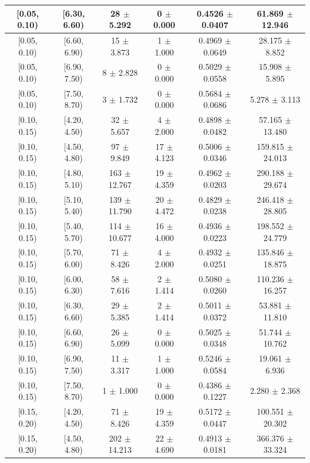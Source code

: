 \begin{longtable}{|c|c|c|c|c|c|}
\hline
[0.05, 0.10) & [6.30, 6.60) & 28 $\pm$ 5.292 & 0 $\pm$ 0.000 & 0.4526 $\pm$ 0.0407 & 61.869 $\pm$ 12.946 \\ 
\hline
[0.05, 0.10) & [6.60, 6.90) & 15 $\pm$ 3.873 & 1 $\pm$ 1.000 & 0.4969 $\pm$ 0.0649 & 28.175 $\pm$ 8.852 \\ 
\hline
[0.05, 0.10) & [6.90, 7.50) & 8 $\pm$ 2.828 & 0 $\pm$ 0.000 & 0.5029 $\pm$ 0.0558 & 15.908 $\pm$ 5.895 \\ 
\hline
[0.05, 0.10) & [7.50, 8.70) & 3 $\pm$ 1.732 & 0 $\pm$ 0.000 & 0.5684 $\pm$ 0.0686 & 5.278 $\pm$ 3.113 \\ 
\hline
[0.10, 0.15) & [4.20, 4.50) & 32 $\pm$ 5.657 & 4 $\pm$ 2.000 & 0.4898 $\pm$ 0.0482 & 57.165 $\pm$ 13.480 \\ 
\hline
[0.10, 0.15) & [4.50, 4.80) & 97 $\pm$ 9.849 & 17 $\pm$ 4.123 & 0.5006 $\pm$ 0.0346 & 159.815 $\pm$ 24.013 \\ 
\hline
[0.10, 0.15) & [4.80, 5.10) & 163 $\pm$ 12.767 & 19 $\pm$ 4.359 & 0.4962 $\pm$ 0.0203 & 290.188 $\pm$ 29.674 \\ 
\hline
[0.10, 0.15) & [5.10, 5.40) & 139 $\pm$ 11.790 & 20 $\pm$ 4.472 & 0.4829 $\pm$ 0.0238 & 246.418 $\pm$ 28.805 \\ 
\hline
[0.10, 0.15) & [5.40, 5.70) & 114 $\pm$ 10.677 & 16 $\pm$ 4.000 & 0.4936 $\pm$ 0.0223 & 198.552 $\pm$ 24.779 \\ 
\hline
[0.10, 0.15) & [5.70, 6.00) & 71 $\pm$ 8.426 & 4 $\pm$ 2.000 & 0.4932 $\pm$ 0.0251 & 135.846 $\pm$ 18.875 \\ 
\hline
[0.10, 0.15) & [6.00, 6.30) & 58 $\pm$ 7.616 & 2 $\pm$ 1.414 & 0.5080 $\pm$ 0.0260 & 110.236 $\pm$ 16.257 \\ 
\hline
[0.10, 0.15) & [6.30, 6.60) & 29 $\pm$ 5.385 & 2 $\pm$ 1.414 & 0.5011 $\pm$ 0.0372 & 53.881 $\pm$ 11.810 \\ 
\hline
[0.10, 0.15) & [6.60, 6.90) & 26 $\pm$ 5.099 & 0 $\pm$ 0.000 & 0.5025 $\pm$ 0.0348 & 51.744 $\pm$ 10.762 \\ 
\hline
[0.10, 0.15) & [6.90, 7.50) & 11 $\pm$ 3.317 & 1 $\pm$ 1.000 & 0.5246 $\pm$ 0.0584 & 19.061 $\pm$ 6.936 \\ 
\hline
[0.10, 0.15) & [7.50, 8.70) & 1 $\pm$ 1.000 & 0 $\pm$ 0.000 & 0.4386 $\pm$ 0.1227 & 2.280 $\pm$ 2.368 \\ 
\hline
[0.15, 0.20) & [4.20, 4.50) & 71 $\pm$ 8.426 & 19 $\pm$ 4.359 & 0.5172 $\pm$ 0.0447 & 100.551 $\pm$ 20.302 \\ 
\hline
[0.15, 0.20) & [4.50, 4.80) & 202 $\pm$ 14.213 & 22 $\pm$ 4.690 & 0.4913 $\pm$ 0.0181 & 366.376 $\pm$ 33.324 \\ 

\end{longtable}
